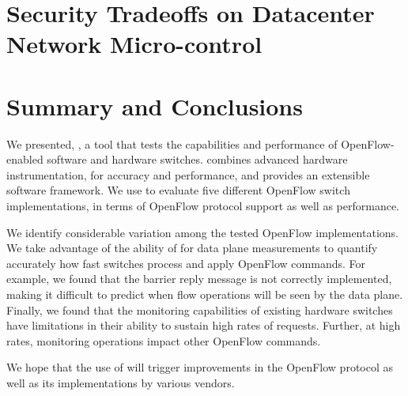 \section{Security Tradeoffs on Datacenter Network Micro-control} \label{sec:rdsf-eval}

\section{Summary and Conclusions}\label{sec:conclusion}
  
We presented, \oflops, a tool that tests the capabilities and performance of 
OpenFlow-enabled software and hardware switches. \oflops combines advanced 
hardware instrumentation, for accuracy and performance, and provides an extensible 
software framework. We use \oflops to evaluate five different OpenFlow switch 
implementations, in terms of OpenFlow protocol support as well as performance.

We identify considerable variation among the tested OpenFlow implementations.
We take advantage of the ability of \oflops for data plane measurements to
quantify accurately how fast switches process and apply OpenFlow commands.
For example, we found that the barrier reply message is not correctly implemented,
making it difficult to predict when flow operations will be seen by the data plane.
Finally, we found that the monitoring capabilities of existing hardware switches 
have limitations in their ability to sustain high rates of requests. Further, at high 
rates, monitoring operations impact other OpenFlow commands.

We hope that the use of \oflops will trigger improvements in the
OpenFlow protocol as well as its implementations by various vendors.



